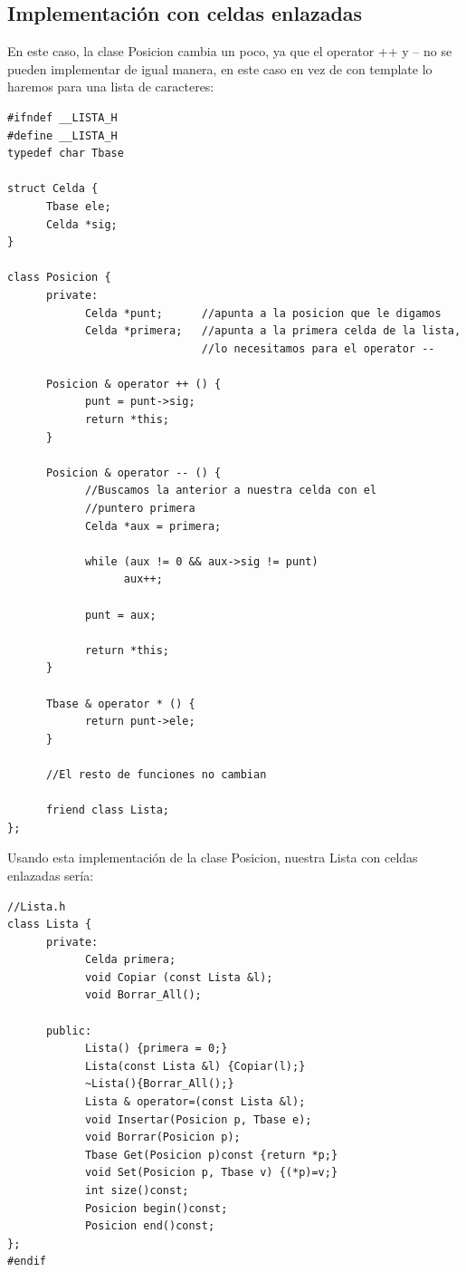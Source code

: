 \documentclass[10pt,a4paper,spanish]{report}
\begin{document}
\subsection{\textcolor[rgb]{0.2,0.5,0.5}Implementación con celdas enlazadas}
\noindent
En este caso, la clase Posicion cambia un poco, ya que el operator ++ y -- no se pueden implementar de igual manera, en este caso en vez de con template lo haremos para una lista de caracteres:
\begin{verbatim}
#ifndef __LISTA_H
#define __LISTA_H
typedef char Tbase

struct Celda {
      Tbase ele;
      Celda *sig;
}

class Posicion {
      private:
            Celda *punt;      //apunta a la posicion que le digamos
            Celda *primera;   //apunta a la primera celda de la lista, 
                              //lo necesitamos para el operator --

      Posicion & operator ++ () {
            punt = punt->sig;
            return *this;
      }

      Posicion & operator -- () {
            //Buscamos la anterior a nuestra celda con el
            //puntero primera
            Celda *aux = primera;

            while (aux != 0 && aux->sig != punt)
                  aux++;

            punt = aux;

            return *this;
      }

      Tbase & operator * () {
            return punt->ele;
      }

      //El resto de funciones no cambian

      friend class Lista;
};
\end{verbatim}

\noindent
Usando esta implementación de la clase Posicion, nuestra Lista con celdas enlazadas sería:
\begin{verbatim}
//Lista.h
class Lista {
      private:
            Celda primera;
            void Copiar (const Lista &l);
            void Borrar_All();

      public:
            Lista() {primera = 0;}
            Lista(const Lista &l) {Copiar(l);}
            ~Lista(){Borrar_All();}
            Lista & operator=(const Lista &l);
            void Insertar(Posicion p, Tbase e);
            void Borrar(Posicion p);
            Tbase Get(Posicion p)const {return *p;}
            void Set(Posicion p, Tbase v) {(*p)=v;}
            int size()const;
            Posicion begin()const;
            Posicion end()const; 
};
#endif
\end{verbatim}
\end{document}
